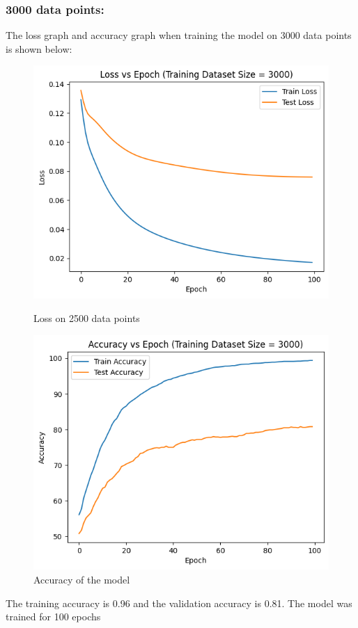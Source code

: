 \documentclass{article}
\begin{document}
\subsubsection*{3000 data points:}
The loss graph and accuracy graph when training the model on 3000 data points is shown below:
\begin{figure}[h!]
    \centering
    \begin{minipage}{0.45\textwidth}
        \centering
        \includegraphics[width=1\textwidth]{output3000.png} %
        \caption{Loss on 2500 data points}
    \end{minipage}\hfill
    \begin{minipage}{0.45\textwidth}
        \centering
        \includegraphics[width=1\textwidth]{acc3000.png} %
        \caption{Accuracy of the model}
    \end{minipage}
\end{figure}
\newline The training accuracy is 0.96 and the validation accuracy is 0.81. The model was trained for 100 epochs
\end{document}
